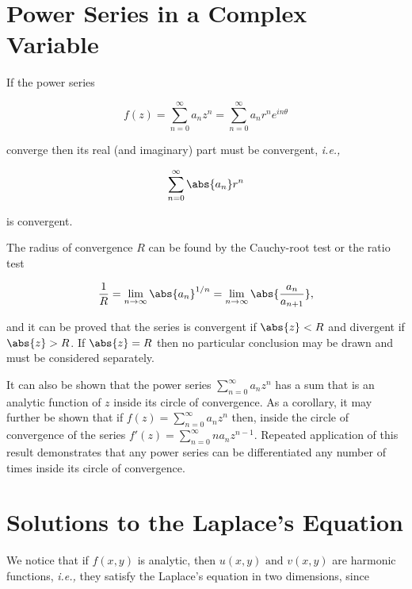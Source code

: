 \documentclass[english,a4paper,12pt]{report}
\begin{document}
\section{Power Series in a Complex Variable}

If the power series

\begin{equation}
    f(z) = \sum_{n=0}^{\infty} a_{n}z^{n}  = \sum_{n=0}^{\infty} a_{n}r^{n} e^{in\theta }        
\end{equation}

converge then its real (and imaginary) part must be convergent, \textit{i.e.,}  

\begin{equation}
    \sum_{n=0}^{\infty} \abs{a_{n} }r^{n}   
\end{equation}

is convergent. 

The radius of convergence \(R\) can be found by the Cauchy-root test or the ratio test

\begin{equation}
    \frac{1}{R} = \lim_{n \to \infty} \abs{a_{n}  } ^{1/n} = \lim_{n \to \infty} \abs{\frac{a_{n} }{a_{n+1} } },  
\end{equation}

and it can be proved that the series is convergent if \(\abs{z} <R \) and divergent if \(\abs{z}>R \). If \(\abs{z} =R \) then no particular conclusion may be drawn and must be considered separately.   

It can also be shown that the power series \(\sum_{n=0}^{\infty} a_{n}z^{n}  \) has a sum that is an analytic function of \(z\)  inside its circle of convergence. As a corollary, it may further be shown that if \(f(z) = \sum_{n=0}^{\infty} a_{n}z^{n}  \) then, inside the circle of convergence of the series \(f'(z) = \sum_{n=0}^{\infty} n a_{n} z^{n-1}   \). Repeated application of this result demonstrates that any power series can be differentiated any number of times inside its circle of convergence.




\section{Solutions to the Laplace's Equation}

We notice that if \(f(x,y)\) is analytic, then \(u(x,y) \text { and } v(x,y)\) are harmonic functions, \textit{i.e.,} they satisfy the Laplace's equation in two dimensions, since
\end{document}
